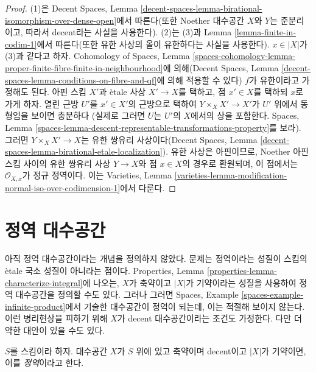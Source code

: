\begin{proof}
(1)은 Decent Spaces, Lemma
\ref{decent-spaces-lemma-birational-isomorphism-over-dense-open}에서
따른다(또한 Noether 대수공간 $X$와 $Y$는 준분리이고, 따라서
decent라는 사실을 사용한다). (2)는 (3)과 Lemma
\ref{lemma-finite-in-codim-1}에서 따른다(또한 유한 사상의 올이
유한하다는 사실을 사용한다). $x \in |X|$가 (3)과 같다고 하자.
Cohomology of Spaces, Lemma
\ref{spaces-cohomology-lemma-proper-finite-fibre-finite-in-neighbourhood}에
의해(Decent Spaces, Lemma
\ref{decent-spaces-lemma-conditions-on-fibre-and-qf}에 의해 적용할 수 있다)
$f$가 유한이라고 가정해도 된다. 아핀 스킴 $X'$과 \`etale 사상
$X' \to X$를 택하고,
점 $x' \in X$를 택하되 $x$로 가게 하자. 열린 근방 $U'$를
$x' \in X'$의 근방으로 택하여
$Y \times_X X' \to X'$가 $U'$ 위에서 동형임을 보이면 충분하다
(실제로 그러면 $U$는 $U'$의 $X$에서의 상을 포함한다. Spaces, Lemma
\ref{spaces-lemma-descent-representable-transformations-property}를 보라).
그러면
$Y \times_X X' \to X$는 유한 쌍유리 사상이다(Decent Spaces, Lemma
\ref{decent-spaces-lemma-birational-etale-localization}). 유한 사상은
아핀이므로, Noether 아핀 스킴 사이의 유한 쌍유리 사상 $Y \to X$와
점 $x \in X$의 경우로 환원되며, 이 점에서는 $\mathcal{O}_{X, x}$가
정규 정역이다.
이는 Varieties, Lemma
\ref{varieties-lemma-modification-normal-iso-over-codimension-1}에서 다룬다.
\end{proof}






\section{정역 대수공간}
\label{section-integral-spaces}

\noindent
아직 정역 대수공간이라는 개념을 정의하지 않았다. 문제는 정역이라는
성질이 스킴의 \`etale 국소 성질이 아니라는 점이다. Properties, Lemma
\ref{properties-lemma-characterize-integral}에 나오는, $X$가 축약이고
$|X|$가 기약이라는 성질을 사용하여 정역 대수공간을 정의할 수도 있다.
그러나 그러면 Spaces, Example \ref{spaces-example-infinite-product}에서
기술한 대수공간이 정역이 되는데, 이는 적절해 보이지 않는다. 이런
병리현상을 피하기 위해 $X$가 decent 대수공간이라는 조건도 가정한다.
다만 더 약한 대안이 있을 수도 있다.

\begin{definition}
\label{definition-integral-algebraic-space}
$S$를 스킴이라 하자. 대수공간 $X$가 $S$ 위에 있고 축약이며 decent이고
$|X|$가 기약이면, 이를 {\it 정역}이라고 한다.
\end{definition}

